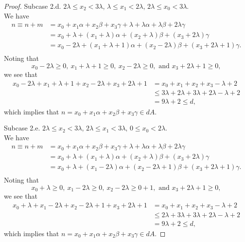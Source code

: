 \begin{proof}
Subcase 2.d. $2\lambda \leq x_2 < 3 \lambda$, $ \lambda \leq x_1 < 2\lambda$,  $2\lambda \leq x_0 < 3\lambda$. \\
We have
\begin{align*}
n \equiv n + m &= x_0 + x_1\alpha + x_2\beta + x_3\gamma + \lambda + \lambda \alpha + \lambda \beta + 2 \lambda \gamma\\
&=  x_0 + \lambda + (x_1 + \lambda) \alpha + (x_2 + \lambda) \beta + (x_3 + 2 \lambda) \gamma\\ 
&=  x_0 -  2\lambda + (x_1 + \lambda + 1) \alpha + (x_2 - 2 \lambda) \beta + (x_3 + 2 \lambda + 1)
 \gamma.\\ 
\end{align*}
Noting that
\[  x_0 -  2\lambda \geq 0,  \ x_1 + \lambda + 1 \geq 0, \  x_2 - 2 \lambda \geq 0, \text{ and } x_3 + 2 \lambda + 1 \geq 0, \]
we see that 
\begin{align*}
x_0 -  2\lambda + x_1 + \lambda + 1 + x_2  - 2 \lambda + x_3 + 2 \lambda + 1 &= x_0  + x_1 +  x_2 + x_3 -  \lambda + 2 \\
&\leq 3 \lambda + 2 \lambda + 3 \lambda + 2\lambda - \lambda + 2\\
&= 9 \lambda + 2 \leq d,
\end{align*}
which implies that $n = x_0 + x_1\alpha + x_2\beta + x_3\gamma \in dA$. 

Subcase 2.e. $2\lambda \leq x_2 < 3 \lambda$, $ 2\lambda \leq x_1 < 3\lambda$,  $0 \leq x_0 < 2\lambda$. \\
We have
\begin{align*}
n \equiv n + m &= x_0 + x_1\alpha + x_2\beta + x_3\gamma + \lambda + \lambda \alpha + \lambda \beta + 2 \lambda \gamma\\
&=  x_0 + \lambda + (x_1 + \lambda) \alpha + (x_2 + \lambda) \beta + (x_3 + 2 \lambda) \gamma\\ 
&=  x_0 +  \lambda + (x_1 - 2 \lambda) \alpha + (x_2 - 2 \lambda + 1) \beta + (x_3 + 2 \lambda + 1)\gamma.\\ 
\end{align*}
Noting that
\[  x_0 +  \lambda \geq 0,  \ x_1 - 2 \lambda \geq 0, \  x_2 - 2 \lambda \geq 0 + 1, \text{ and } x_3 + 2 \lambda + 1 \geq 0, \]
we see that 
\begin{align*}
x_0 + \lambda + x_1 - 2 \lambda + x_2  - 2 \lambda + 1 + x_3 + 2 \lambda + 1 &= x_0  + x_1 +  x_2 + x_3 -  \lambda + 2 \\
&\leq 2 \lambda + 3 \lambda + 3 \lambda + 2\lambda -  \lambda + 2\\
&= 9 \lambda + 2 \leq d,
\end{align*}
which implies that $n = x_0 + x_1\alpha + x_2\beta + x_3\gamma \in dA$. 


\end{proof}
